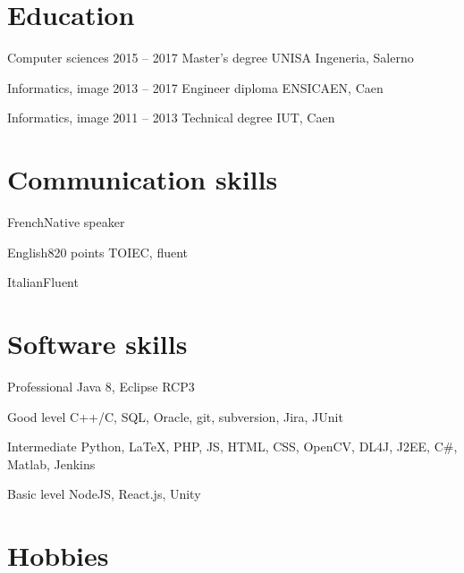 \documentclass{tccv-master/tccv}
\begin{document}
\section{Education}

\begin{yearlist}

\item[Computer sciences]{2015 -- 2017}
     {Master's degree}
     {UNISA Ingeneria, Salerno}

\item[Informatics, image]{2013 -- 2017}
     {Engineer diploma}
     {ENSICAEN, Caen}

\item[Informatics, image]{2011 -- 2013}
     {Technical degree}
     {IUT, Caen}

\end{yearlist}

\section{Communication skills}

\begin{factlist}
\item{French}{Native speaker}
\item{English}{820 points TOIEC, fluent}
\item{Italian}{Fluent}
\end{factlist}

\section{Software skills}

\begin{factlist}

\item{Professional}
	{Java 8, Eclipse RCP3}
\item{Good level}
     {C++/C, SQL, Oracle, git, subversion, Jira, JUnit}

\item{Intermediate}
     {Python, \LaTeX, PHP, JS, HTML, CSS, OpenCV, DL4J, J2EE, C\#, Matlab, Jenkins}

\item{Basic level}
     {NodeJS, React.js, Unity}

\end{factlist}

\section{Hobbies}
\end{document}
